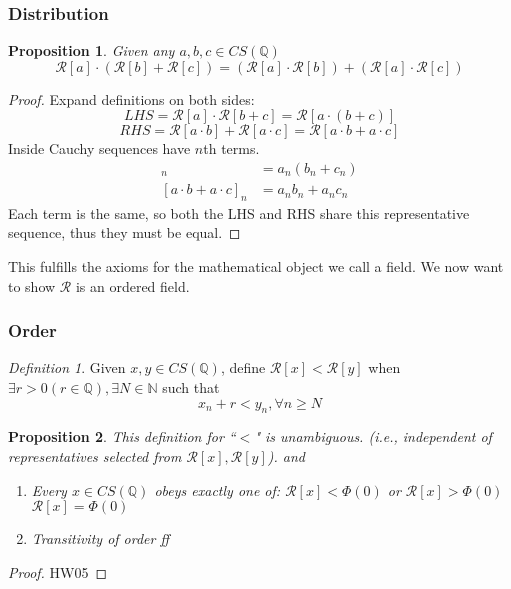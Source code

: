 \documentclass{article}
\theoremstyle{plain}
\newtheorem{proposition}{Proposition}
\theoremstyle{remark}
\newtheorem{definition}{Definition}
\newcommand{\N}{{\mathbb N}}
\newcommand{\Q}{{\mathbb Q}}
\begin{document}
\subsubsection{Distribution}
\begin{proposition}
	Given any $a,b,c \in CS(\Q)$
	\[
		\mathcal{R}[a]\cdot(\mathcal{R}[b]+\mathcal{R}[c])
		=(\mathcal{R}[a] \cdot \mathcal{R}[b]) +
		(\mathcal{R}[a] \cdot \mathcal{R}[c])
	\]
\end{proposition}
\begin{proof}
	Expand definitions on both sides:
	\[
		LHS = \mathcal{R}[a]\cdot\mathcal{R}[b+c] = \mathcal{R}[a\cdot(b+c)]
	\]
	\[
		RHS = \mathcal{R}[a\cdot b] + \mathcal{R}[a\cdot c]
		= \mathcal{R}[a\cdot b + a\cdot c]
	\]
	Inside Cauchy sequences have $n$th terms.
	\begin{align*}
		[a\cdot(b+c)]_n &= a_n(b_n+c_n)\\
		[a\cdot b + a\cdot c]_n &= a_nb_n + a_nc_n
	\end{align*}
	Each term is the same, so both the LHS and RHS share
	this representative sequence, thus they must be equal.
\end{proof}

This fulfills the axioms for the mathematical object we call a field.
We now want to show $\mathcal{R}$ is an ordered field.

\subsubsection{Order}
\begin{definition}
	Given $x,y \in CS(\Q)$, define $\mathcal{R}[x] < \mathcal{R}[y]$
	when $\exists r > 0 (r \in \Q), \exists N \in \N$ such that
	\[
		x_n + r < y_n, \forall n \geq N
	\]
\end{definition}
\begin{proposition}
	This definition for ``$<$" is unambiguous.
	(i.e., independent of representatives selected from $\mathcal{R}[x], \mathcal{R}[y]$).
	and
	\begin{enumerate}
		\item Every $x \in CS(\Q)$ obeys exactly one of:
			$\mathcal{R}[x] < \Phi(0)$ or $\mathcal{R}[x] > \Phi(0)$
			$\mathcal{R}[x] = \Phi(0)$
		\item Transitivity of order ff
	\end{enumerate}
\end{proposition}
\begin{proof}
	HW05
\end{proof}
\end{document}
